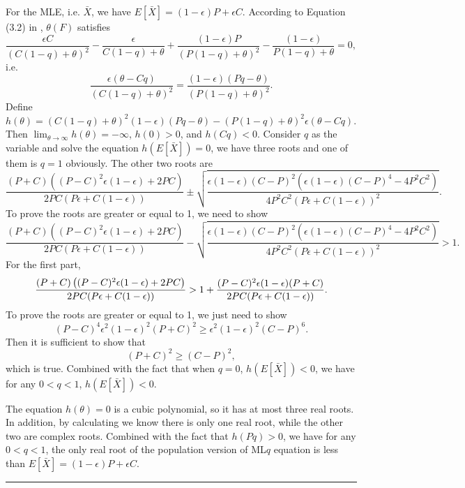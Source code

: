 \documentclass[a4paper]{article}
\newenvironment{proof}{{\bf Proof:  }}{\hfill\rule{2mm}{2mm}}
\begin{document}
\begin{proof}
For the MLE, i.e. $\bar{X}$, we have $E[\bar{X}] = (1-\epsilon) P + \epsilon C$.
According to Equation (3.2) in \citep{ferrari2010}, $\theta(F)$ satisfies
\[
\frac{\epsilon C}{(C(1-q) + \theta)^2} - \frac{\epsilon}{C(1-q) + \theta}
+\frac{(1-\epsilon) P}{(P(1-q) + \theta)^2} - \frac{(1-\epsilon)}{P(1-q) + \theta}
= 0,
\]
i.e.
\[
\frac{\epsilon (\theta - Cq)}{(C(1-q) + \theta)^2} =
\frac{(1-\epsilon) (P q - \theta)}{(P(1-q) + \theta)^2}.
\]
Define $h(\theta) = (C(1-q) + \theta)^2 (1-\epsilon) (P q - \theta) - (P(1-q) + \theta)^2 \epsilon (\theta - Cq)$.
Then $\lim_{\theta \to \infty}h(\theta) = -\infty$, $h(0) > 0$, and $h(Cq) < 0$.
Consider $q$ as the variable and solve the equation $h(E[\bar{X}]) = 0$, we have three roots and one of them is $q = 1$ obviously.
The other two roots are
\[
\frac{(P + C)\left( (P-C)^2 \epsilon(1-\epsilon) + 2PC \right)}{2PC(P \epsilon + C(1-\epsilon))}
\pm \sqrt{\frac{\epsilon(1-\epsilon)(C-P)^2\left(\epsilon(1-\epsilon)(C-P)^4 - 4P^2C^2\right)}{4 P^2 C^2 (P\epsilon + C(1-\epsilon))^2}}.
\]
To prove the roots are greater or equal to 1, we need to show
\[
\frac{(P + C)\left( (P-C)^2 \epsilon(1-\epsilon) + 2PC \right)}{2PC(P \epsilon + C(1-\epsilon))}
- \sqrt{\frac{\epsilon(1-\epsilon)(C-P)^2\left(\epsilon(1-\epsilon)(C-P)^4 - 4P^2C^2\right)}{4 P^2 C^2 (P\epsilon + C(1-\epsilon))^2}} > 1.
\]
For the first part,
\[
\frac{(P + C)\left( (P-C)^2 \epsilon(1-\epsilon) + 2PC \right)}{2PC(P \epsilon + C(1-\epsilon))}\\
> 1 + \frac{(P-C)^2 \epsilon (1-\epsilon) (P+C)}{2PC(P \epsilon + C(1-\epsilon))}.
\]
To prove the roots are greater or equal to 1, we just need to show
\[
(P-C)^4 \epsilon^2 (1-\epsilon)^2 (P+C)^2 \ge \epsilon^2(1-\epsilon)^2(C-P)^6.
\]
Then it is sufficient to show that
\[
(P+C)^2 \ge (C-P)^2,
\]
which is true.
Combined with the fact that when $q = 0$, $h(E[\bar{X}]) < 0$, we have for any $0 < q < 1$, $h(E[\bar{X}]) < 0$.

The equation $h(\theta) = 0$ is a cubic polynomial, so it has at most three real roots. In addition, by calculating we know there is only one real root, while the other two are complex roots. Combined with the fact that $h(P q) > 0$, we have for any $0 < q < 1$, the only real root of the population version of ML$q$ equation is less than $E[\bar{X}] = (1-\epsilon)P + \epsilon C$.
\end{proof}
\end{document}
